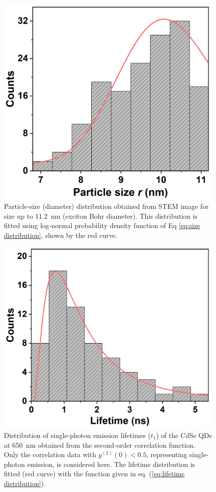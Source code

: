 \documentclass[%
 aip,
 amsmath,amssymb,
 reprint,%
]{revtex4-1}
\begin{document}
\begin{figure}
    \centering
    \includegraphics[width=0.8\linewidth, height=0.7\linewidth]{histogram of size.png}
    \caption{Particle-size (diameter) distribution obtained from STEM image for size up to 11.2~nm (exciton Bohr diameter). This distribution is fitted using log-normal probability density function of Eq \eqref{eq:size distribution}, shown by the red curve.}
    \label{fig:size histogram}
\end{figure}

\begin{figure}
    \centering
    \includegraphics[width=0.8\linewidth, height=0.7\linewidth]{histogram of lifetime.png}
    \caption{Distribution of single-photon emission lifetimes ($t_1$) of the CdSe QDs at 650~nm obtained from the second-order correlation function. Only the correlation data with $g^{(2)}(0) < 0.5$, representing single-photon emission, is considered here. The lifetime distribution is fitted (red curve) with the function given in eq. (\ref{eq:lifetime distribution}).} 
    \label{fig:lifetime histogram}
\end{figure}
\end{document}
